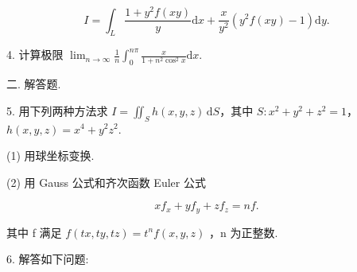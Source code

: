 \documentclass{examcollection}
\renewcommand{\displayformula}[1]{\[#1\]}
\begin{document}
{\begin{minipage}{\textwidth}
\displayformula{I = \int_ {L} \frac {1 + y ^ {2} f (x y)}{y} \mathrm{d} x + \frac {x}{y ^ {2}} (y ^ {2} f (x y) - 1) \mathrm{d} y.}\par
4. 计算极限 $\lim_{n\to \infty}\frac{1}{n}\int_0^{n\pi}\frac{x}{1 + n^2\cos^2x}\mathrm{d}x.$\par
二. 解答题.\par
5. 用下列两种方法求 $I = \iint_{S} h(x, y, z) \, \mathrm{d}S$，其中 $S: x^2 + y^2 + z^2 = 1$，$h(x, y, z) = x^4 + y^2 z^2$.\par
(1) 用球坐标变换.\par
(2) 用 Gauss 公式和齐次函数 Euler 公式\par
\displayformula{x f _ {x} + y f _ {y} + z f _ {z} = n f.}\par
其中 f 满足  $f(tx,ty,tz)=t^{n}f(x,y,z)$ ，n 为正整数.\par
6. 解答如下问题:\par
\end{minipage}}
\ifdim\dimexpr\ht\proofbox+\dp\proofbox\relax>\textheight
\noindent\resizebox{!}{\textheight}{\usebox{\proofbox}}\else\noindent\usebox{\proofbox}\fi\clearpage
\end{document}
